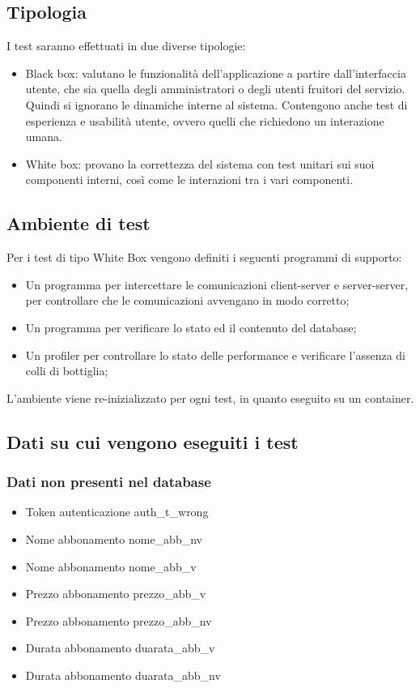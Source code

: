 \subsection*{Tipologia}
I test saranno effettuati in due diverse tipologie:
\begin{itemize}
    \item Black box: valutano le funzionalità dell'applicazione a partire dall'interfaccia utente, che
    sia quella degli amministratori o degli utenti fruitori del servizio. Quindi si ignorano le dinamiche
    interne al sistema. Contengono anche test di esperienza e usabilità utente, ovvero quelli che richiedono
    un interazione umana.
    \item White box: provano la correttezza del sistema con test unitari sui suoi componenti interni, 
    così come le interazioni tra i vari componenti.
\end{itemize}

\subsection*{Ambiente di test}
Per i test di tipo White Box vengono definiti i seguenti programmi di supporto:
\begin{itemize}
    \item Un programma per intercettare le comunicazioni client-server e server-server, per controllare che le
    comunicazioni avvengano in modo corretto;
    \item Un programma per verificare lo stato ed il contenuto del database;
    \item Un profiler per controllare lo stato delle performance e verificare l’assenza di colli di bottiglia;
\end{itemize}
L’ambiente viene re-inizializzato per ogni test, in quanto eseguito su un container.

\subsection*{Dati su cui vengono eseguiti i test}

\subsubsection*{Dati non presenti nel database}
\begin{itemize}
    \item Token autenticazione auth\_t\_wrong
    \item Nome abbonamento nome\_abb\_nv
    \item Nome abbonamento nome\_abb\_v
    \item Prezzo abbonamento prezzo\_abb\_v
    \item Prezzo abbonamento prezzo\_abb\_nv
    \item Durata abbonamento duarata\_abb\_v
    \item Durata abbonamento duarata\_abb\_nv


\end{itemize}

